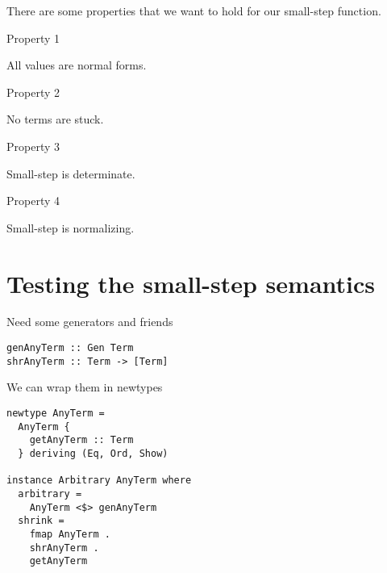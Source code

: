 \documentclass[aspectration=169]{beamer}
\begin{document}
\begin{frame}[c]
  \begin{center}
There are some properties that we want to hold for our small-step function.
  \end{center}
\end{frame}

\begin{frame}[c]
  Property 1
  \begin{center}
All values are normal forms.
  \end{center}
\end{frame}

\begin{frame}[c]
  Property 2
  \begin{center}
No terms are stuck.
  \end{center}
\end{frame}

\begin{frame}[c]
  Property 3
  \begin{center}
Small-step is determinate.
  \end{center}
\end{frame}

\begin{frame}[c]
  Property 4
  \begin{center}
Small-step is normalizing.
  \end{center}
\end{frame}

\section{Testing the small-step semantics}

\begin{frame}[fragile]
  \begin{center}
  Need some generators and friends
  \end{center}
  \begin{verbatim}
genAnyTerm :: Gen Term
shrAnyTerm :: Term -> [Term]
  \end{verbatim}
\end{frame}

\begin{frame}[fragile]
  \begin{center}
  We can wrap them in newtypes
  \end{center}
  \begin{verbatim}
newtype AnyTerm = 
  AnyTerm { 
    getAnyTerm :: Term 
  } deriving (Eq, Ord, Show)
   
instance Arbitrary AnyTerm where 
  arbitrary = 
    AnyTerm <$> genAnyTerm
  shrink = 
    fmap AnyTerm .
    shrAnyTerm .
    getAnyTerm
  \end{verbatim}
\end{frame}
\end{document}
